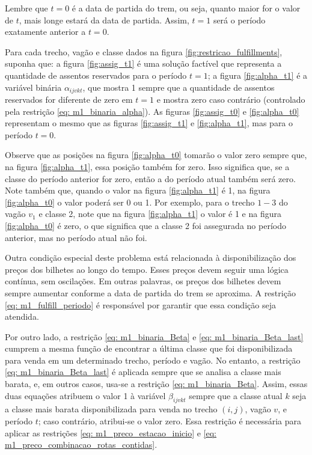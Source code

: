 Lembre que $t=0$ é a data de partida do trem, ou seja, quanto maior for o valor de $t$, mais longe estará da data de partida. Assim, $t=1$ será o período exatamente anterior a $t=0$.

Para cada trecho, vagão e classe dados na figura \ref{fig:restricao_fulfillments}, suponha que: a figura \ref{fig:assig_t1} é uma solução factível que representa a quantidade de assentos reservados para o período $t=1$; a figura \ref{fig:alpha_t1}  é a variável binária $\alpha_{ijvkt}$, que mostra 1 sempre que a quantidade de assentos reservados for diferente de zero em $t=1$ e mostra zero caso contrário (controlado pela restrição \ref{eq: m1_binaria_alpha}). As figuras \ref{fig:assig_t0} e \ref{fig:alpha_t0} representam o mesmo que as figuras \ref{fig:assig_t1} e \ref{fig:alpha_t1}, mas para o período $t=0$.

Observe que as posições na figura \ref{fig:alpha_t0} tomarão o valor zero sempre que, na figura \ref{fig:alpha_t1}, essa posição também for zero. Isso significa que, se a classe do período anterior for zero, então a do período atual também será zero. Note também que, quando o valor na figura \ref{fig:alpha_t1} é 1, na figura \ref{fig:alpha_t0} o valor poderá ser 0 ou 1. Por exemplo, para o trecho $1-3$ do vagão $v_1$ e classe 2, note que na figura \ref{fig:alpha_t1} o valor é 1 e na figura \ref{fig:alpha_t0} é zero, o que significa que a classe 2 foi assegurada no período anterior, mas no período atual não foi.


Outra condição especial deste problema está relacionada à disponibilização dos preços dos bilhetes ao longo do tempo. Esses preços devem seguir uma lógica contínua, sem oscilações. Em outras palavras, os preços dos bilhetes devem sempre aumentar conforme a data de partida do trem se aproxima. A restrição \ref{eq: m1_fulfill_periodo} é responsável por garantir que essa condição seja atendida.

Por outro lado, a restrição \ref{eq: m1_binaria_Beta} e \ref{eq: m1_binaria_Beta_last} cumprem a mesma função de encontrar a última classe que foi disponibilizada para venda em um determinado trecho, período e vagão. No entanto, a restrição \ref{eq: m1_binaria_Beta_last} é aplicada sempre que se analisa a classe mais barata, e, em outros casos, usa-se a restrição \ref{eq: m1_binaria_Beta}. Assim, essas duas equações atribuem o valor 1 à variável $\beta_{ijvkt}$ sempre que a classe atual $k$ seja a classe mais barata disponibilizada para venda no trecho $(i,j)$, vagão $v$, e período $t$; caso contrário, atribui-se o valor zero. Essa restrição é necessária para aplicar as restrições \ref{eq: m1_preco_estacao_inicio} e \ref{eq: m1_preco_combinacao_rotas_contidas}.

